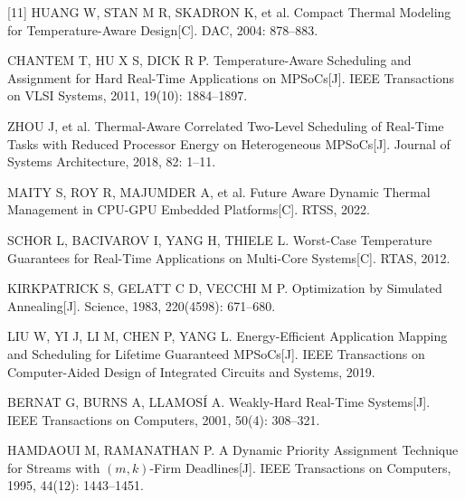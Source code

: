 [11] HUANG W, STAN M R, SKADRON K, et al. Compact Thermal Modeling for Temperature-Aware Design[C]. DAC, 2004: 878--883.\par
[12] CHANTEM T, HU X S, DICK R P. Temperature-Aware Scheduling and Assignment for Hard Real-Time Applications on MPSoCs[J]. IEEE Transactions on VLSI Systems, 2011, 19(10): 1884--1897.\par
[13] ZHOU J, et al. Thermal-Aware Correlated Two-Level Scheduling of Real-Time Tasks with Reduced Processor Energy on Heterogeneous MPSoCs[J]. Journal of Systems Architecture, 2018, 82: 1--11.\par
[14] MAITY S, ROY R, MAJUMDER A, et al. Future Aware Dynamic Thermal Management in CPU-GPU Embedded Platforms[C]. RTSS, 2022.\par
[15] SCHOR L, BACIVAROV I, YANG H, THIELE L. Worst-Case Temperature Guarantees for Real-Time Applications on Multi-Core Systems[C]. RTAS, 2012.\par
[16] KIRKPATRICK S, GELATT C D, VECCHI M P. Optimization by Simulated Annealing[J]. Science, 1983, 220(4598): 671--680.\par
[17] LIU W, YI J, LI M, CHEN P, YANG L. Energy-Efficient Application Mapping and Scheduling for Lifetime Guaranteed MPSoCs[J]. IEEE Transactions on Computer-Aided Design of Integrated Circuits and Systems, 2019.\par
[18] BERNAT G, BURNS A, LLAMOS\'{I} A. Weakly-Hard Real-Time Systems[J]. IEEE Transactions on Computers, 2001, 50(4): 308--321.\par
[19] HAMDAOUI M, RAMANATHAN P. A Dynamic Priority Assignment Technique for Streams with $(m,k)$-Firm Deadlines[J]. IEEE Transactions on Computers, 1995, 44(12): 1443--1451.\par
\endgroup
